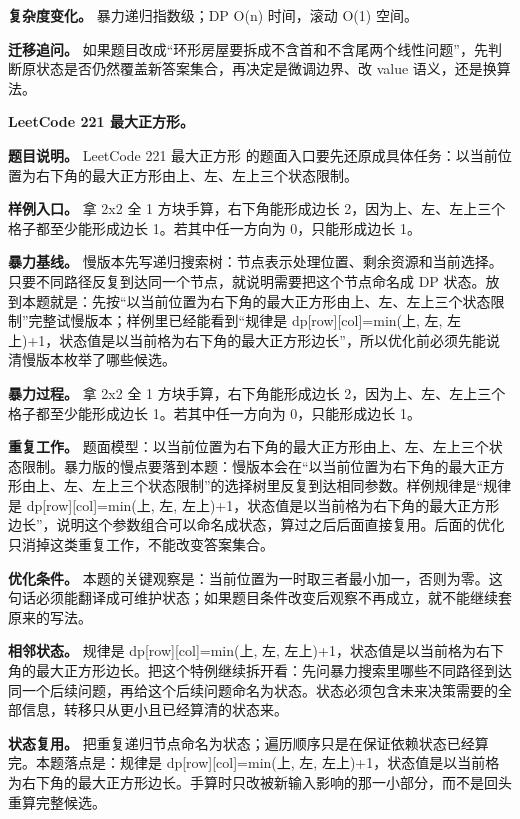 \textbf{复杂度变化。} 暴力递归指数级；DP O(n) 时间，滚动 O(1) 空间。

\textbf{迁移追问。} 如果题目改成“环形房屋要拆成不含首和不含尾两个线性问题”，先判断原状态是否仍然覆盖新答案集合，再决定是微调边界、改 value 语义，还是换算法。

\noindent\textbf{LeetCode 221 最大正方形。}

\textbf{题目说明。} LeetCode 221 最大正方形 的题面入口要先还原成具体任务：以当前位置为右下角的最大正方形由上、左、左上三个状态限制。

\textbf{样例入口。} 拿 2x2 全 1 方块手算，右下角能形成边长 2，因为上、左、左上三个格子都至少能形成边长 1。若其中任一方向为 0，只能形成边长 1。

\textbf{暴力基线。} 慢版本先写递归搜索树：节点表示处理位置、剩余资源和当前选择。只要不同路径反复到达同一个节点，就说明需要把这个节点命名成 DP 状态。放到本题就是：先按“以当前位置为右下角的最大正方形由上、左、左上三个状态限制”完整试慢版本；样例里已经能看到“规律是 dp[row][col]=min(上, 左, 左上)+1，状态值是以当前格为右下角的最大正方形边长”，所以优化前必须先能说清慢版本枚举了哪些候选。

\textbf{暴力过程。} 拿 2x2 全 1 方块手算，右下角能形成边长 2，因为上、左、左上三个格子都至少能形成边长 1。若其中任一方向为 0，只能形成边长 1。

\textbf{重复工作。} 题面模型：以当前位置为右下角的最大正方形由上、左、左上三个状态限制。暴力版的慢点要落到本题：慢版本会在“以当前位置为右下角的最大正方形由上、左、左上三个状态限制”的选择树里反复到达相同参数。样例规律是“规律是 dp[row][col]=min(上, 左, 左上)+1，状态值是以当前格为右下角的最大正方形边长”，说明这个参数组合可以命名成状态，算过之后后面直接复用。后面的优化只消掉这类重复工作，不能改变答案集合。

\textbf{优化条件。} 本题的关键观察是：当前位置为一时取三者最小加一，否则为零。这句话必须能翻译成可维护状态；如果题目条件改变后观察不再成立，就不能继续套原来的写法。

\textbf{相邻状态。} 规律是 dp[row][col]=min(上, 左, 左上)+1，状态值是以当前格为右下角的最大正方形边长。把这个特例继续拆开看：先问暴力搜索里哪些不同路径到达同一个后续问题，再给这个后续问题命名为状态。状态必须包含未来决策需要的全部信息，转移只从更小且已经算清的状态来。

\textbf{状态复用。} 把重复递归节点命名为状态；遍历顺序只是在保证依赖状态已经算完。本题落点是：规律是 dp[row][col]=min(上, 左, 左上)+1，状态值是以当前格为右下角的最大正方形边长。手算时只改被新输入影响的那一小部分，而不是回头重算完整候选。

